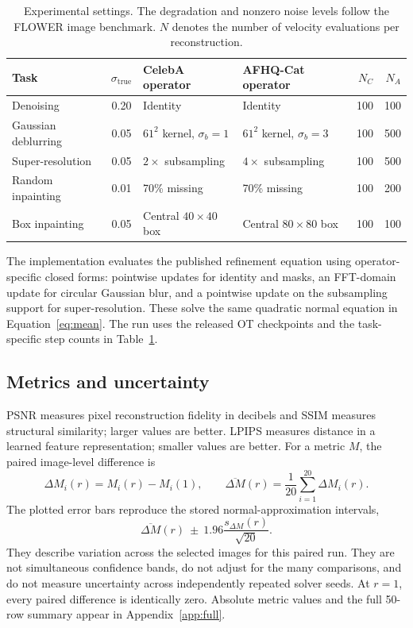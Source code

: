 \documentclass[10pt,letterpaper]{article}
\newcommand{\st}{\sigma_{\mathrm{true}}}
\begin{document}
\begin{table}[H]\centering\small
\caption{Experimental settings. The degradation and nonzero noise levels follow the FLOWER image benchmark. $N$ denotes the number of velocity evaluations per reconstruction.}
\label{tab:protocol}
\begin{tabular}{lcllrr}
\toprule
Task & $\st$ & CelebA operator & AFHQ-Cat operator & $N_C$ & $N_A$\\
\midrule
Denoising & 0.20 & Identity & Identity & 100 & 100\\
Gaussian deblurring & 0.05 & $61^2$ kernel, $\sigma_b=1$ & $61^2$ kernel, $\sigma_b=3$ & 100 & 500\\
Super-resolution & 0.05 & $2\times$ subsampling & $4\times$ subsampling & 100 & 500\\
Random inpainting & 0.01 & 70\% missing & 70\% missing & 100 & 200\\
Box inpainting & 0.05 & Central $40\times40$ box & Central $80\times80$ box & 100 & 100\\
\bottomrule
\end{tabular}
\end{table}
The implementation evaluates the published refinement equation using operator-specific closed forms: pointwise updates for identity and masks, an FFT-domain update for circular Gaussian blur, and a pointwise update on the subsampling support for super-resolution. These solve the same quadratic normal equation in Equation~\eqref{eq:mean}. The run uses the released OT checkpoints and the task-specific step counts in Table~\ref{tab:protocol}.

\subsection{Metrics and uncertainty}
PSNR measures pixel reconstruction fidelity in decibels and SSIM measures structural similarity; larger values are better. LPIPS measures distance in a learned feature representation; smaller values are better. For a metric $M$, the paired image-level difference is
\begin{equation}
 \Delta M_i(r)=M_i(r)-M_i(1),\qquad
 \overline{\Delta M}(r)=\frac1{20}\sum_{i=1}^{20}\Delta M_i(r).
 \label{eq:delta}
\end{equation}
The plotted error bars reproduce the stored normal-approximation intervals,
\begin{equation}
 \overline{\Delta M}(r)\ \pm\ 1.96\frac{s_{\Delta M}(r)}{\sqrt{20}}.
 \label{eq:ci}
\end{equation}
They describe variation across the selected images for this paired run. They are not simultaneous confidence bands, do not adjust for the many comparisons, and do not measure uncertainty across independently repeated solver seeds. At $r=1$, every paired difference is identically zero. Absolute metric values and the full 50-row summary appear in Appendix~\ref{app:full}.
\end{document}
